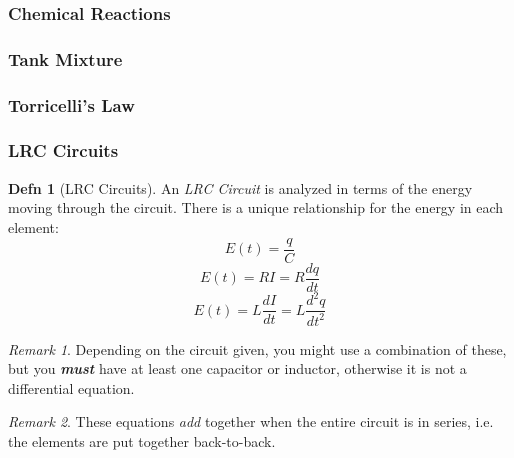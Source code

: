 \documentclass[10pt,letterpaper,final,twoside,notitlepage]{article}
\theoremstyle{plain}
\theoremstyle{definition}
\newtheorem{definition}{Defn}
\theoremstyle{remark}
\newtheorem{remark}{Remark}[definition]
\begin{document}
		\subsubsection{Chemical Reactions} \label{subsubsec:Chem Reactions}
		\subsubsection{Tank Mixture} \label{subsubsec:Tank Mixture}
		\subsubsection{Torricelli's Law} \label{subsubsec:Torricelli's Law}
		\subsubsection{LRC Circuits} \label{subsubsec:LRC Circuits}
			\begin{definition}[LRC Circuits] \label{def:LRC Circuits}
				An \emph{LRC Circuit} is analyzed in terms of the energy moving through the circuit.
				There is a unique relationship for the energy in each element:
				\begin{equation} \label{eq:Energy in Capacitor}
					E \left( t \right) = \frac{q}{C}
				\end{equation}
				\begin{equation} \label{eq:Energy in Resistor}
					E \left( t \right) = RI = R \frac{dq}{dt}
				\end{equation}
				\begin{equation} \label{eq:Energy in Inductor}
					E \left( t \right) = L \frac{dI}{dt} = L \frac{d^{2}q}{dt^{2}}
				\end{equation}
				\begin{remark}
					Depending on the circuit given, you might use a combination of these, but you \emph{\textbf{must}} have at least one capacitor or inductor, otherwise it is not a differential equation.
				\end{remark}
				\begin{remark}
					These equations \emph{add} together when the entire circuit is in series, i.e. the elements are put together back-to-back.
				\end{remark}
			\end{definition}
	
\end{document}
